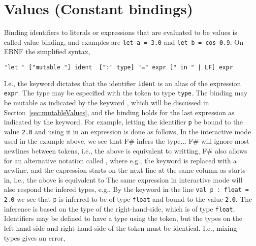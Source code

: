 \section{Values (Constant bindings)}
Binding identifiers to literals or expressions that are evaluated to be values is called value binding, and examples are \lstinline!let a = 3.0! and \lstinline!let b = cos 0.9!. On EBNF the simplified syntax,
%
\begin{lstlisting}[language=EBNF]
"let " ["mutable "] ident  [":" type] "=" expr [" in " | LF] expr
\end{lstlisting}
I.e., the  keyword dictates that the identifier \lstinline[language=EBNF]!ident! is an alias of the expression \lstinline[language=EBNF]!expr!. The type may be especified with the \idx{\token{:}} token to type \lstinline[language=EBNF]!type!. The binding may be mutable as indicated by the keyword , which will be discussed in Section~\ref{sec:mutableValues}, and the binding holds  for the last expression as indicated by the  keyword. For example, letting the identifier \lstinline!p! be bound to the value \lstinline!2.0! and using it in an expression is done as follows,
%
%
In the interactive mode used in the example above, we see that F\# infers the type...
F\# will ignore most newlines between tokens, i.e., the above is equivalent to writting,
%
%
F\# also allows for an alternative notation called , where e.g., the  keyword is replaced with a newline, and the expression starts on the next line at the same column as  starts in, i.e., the above is equivalent to
%
%
The same expression in interactive mode will also respond the infered types, e.g.,
%
%
By the  keyword in the line \lstinline!val p : float = 2.0! we see that \lstinline!p! is inferred to be of type \lstinline!float! and bound to the value \lstinline!2.0!. The inference is based on the type of the right-hand-side, which is of type \lstinline!float!.  Identifiers may be defined to have a type using the \token{:} token, but the types on the left-hand-side and right-hand-side of the \token{=} token must be identical. I.e., mixing types gives an error,
